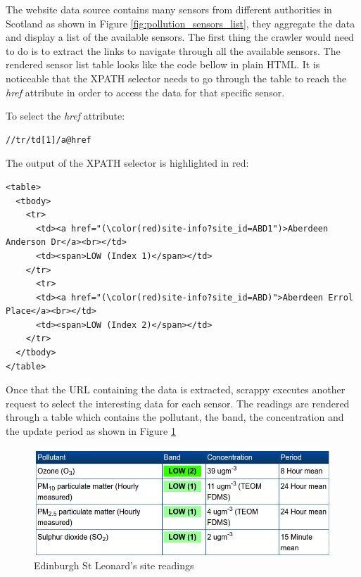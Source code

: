 The website data source contains many sensors from different authorities in Scotland as shown in Figure \ref{fig:pollution_sensors_list}, they aggregate the data and display a list of the available sensors. The first thing the crawler would need to do is to extract the links to navigate through all the available sensors. The rendered sensor list table looks like the code bellow in plain HTML. It is noticeable that the XPATH selector needs to go through the table to reach the \textit{href} attribute in order to access the data for that specific sensor. 

To select the \textit{href} attribute: \bigskip

{\centering
\begin{BVerbatim}
//tr/td[1]/a@href
\end{BVerbatim}
\par
}\bigskip

The output of the XPATH selector is highlighted in red: 

\begin{Verbatim}[fontsize=\small,commandchars=\\\(\)]
<table>
  <tbody>
    <tr>
      <td><a href="(\color(red)site-info?site_id=ABD1")>Aberdeen Anderson Dr</a><br></td>
      <td><span>LOW (Index 1)</span></td>
    </tr>
      <tr>
      <td><a href="(\color(red)site-info?site_id=ABD)">Aberdeen Errol Place</a><br></td>
      <td><span>LOW (Index 2)</span></td>
    </tr>
  </tbody>
</table>
\end{Verbatim}

Once that the URL containing the data is extracted, scrappy executes another request to select the interesting data for each sensor. The readings are rendered through a table which contains the pollutant, the band, the concentration and the update period as shown in Figure \ref{fig:pollution_site readings}

\begin{figure}[H]
\begin{adjustbox}{width=.5\textwidth,center=\textwidth}
  \centering
  \includegraphics[scale=1]{images/site_readings.png}
\end{adjustbox}
  \caption[Edinburgh St Leonard's site readings]{Edinburgh St Leonard's site readings \footnotemark}
  \label{fig:pollution_site readings}
\end{figure}

